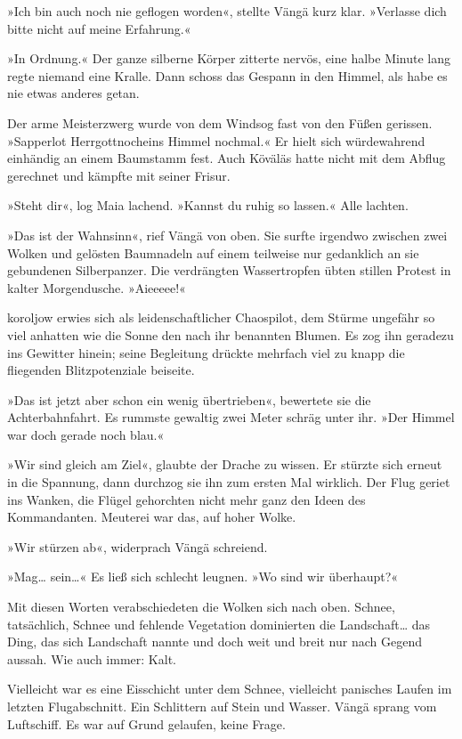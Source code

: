 »Ich bin auch noch nie geflogen worden«, stellte Vängä kurz klar. »Verlasse dich bitte nicht auf meine Erfahrung.«

»In Ordnung.« Der ganze silberne Körper zitterte nervös, eine halbe Minute lang regte niemand eine Kralle. Dann schoss das Gespann in den Himmel, als habe es nie etwas anderes getan.

Der arme Meisterzwerg wurde von dem Windsog fast von den Füßen gerissen. »Sapperlot Herrgottnocheins Himmel nochmal.« Er hielt sich würdewahrend einhändig an einem Baumstamm fest. Auch Köväläs hatte nicht mit dem Abflug gerechnet und kämpfte mit seiner Frisur.

»Steht dir«, log Maia lachend. »Kannst du ruhig so lassen.« Alle lachten.

»Das ist der Wahnsinn«, rief Vängä von oben. Sie surfte irgendwo zwischen zwei Wolken und gelösten Baumnadeln auf einem teilweise nur gedanklich an sie gebundenen Silberpanzer. Die verdrängten Wassertropfen übten stillen Protest in kalter Morgendusche. »Aieeeee!«

koroljow erwies sich als leidenschaftlicher Chaospilot, dem Stürme ungefähr so viel anhatten wie die Sonne den nach ihr benannten Blumen. Es zog ihn geradezu ins Gewitter hinein; seine Begleitung drückte mehrfach viel zu knapp die fliegenden Blitzpotenziale beiseite.

»Das ist jetzt aber schon ein wenig übertrieben«, bewertete sie die Achterbahnfahrt. Es rummste gewaltig zwei Meter schräg unter ihr. »Der Himmel war doch gerade noch blau.«

»Wir sind gleich am Ziel«, glaubte der Drache zu wissen. Er stürzte sich erneut in die Spannung, dann durchzog sie ihn zum ersten Mal wirklich. Der Flug geriet ins Wanken, die Flügel gehorchten nicht mehr ganz den Ideen des Kommandanten. Meuterei war das, auf hoher Wolke.

»Wir stürzen ab«, widerprach Vängä schreiend.

»Mag… sein…« Es ließ sich schlecht leugnen. »Wo sind wir überhaupt?«

Mit diesen Worten verabschiedeten die Wolken sich nach oben. Schnee, tatsächlich, Schnee und fehlende Vegetation dominierten die Landschaft… das Ding, das sich Landschaft nannte und doch weit und breit nur nach Gegend aussah. Wie auch immer: Kalt.

Vielleicht war es eine Eisschicht unter dem Schnee, vielleicht panisches Laufen im letzten Flugabschnitt. Ein Schlittern auf Stein und Wasser. Vängä sprang vom Luftschiff. Es war auf Grund gelaufen, keine Frage.

